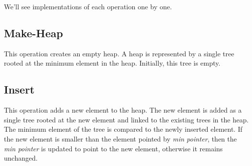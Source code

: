 \documentclass[12pt, a4paper]{article}
\begin{document}
	We'll see implementations of each operation one by one.

	
	\subsection{Make-Heap}
	This operation creates an empty heap. A heap is represented by a single tree rooted at the minimum element in the heap. Initially, this tree is empty.
	
	\subsection{Insert}
	This operation adds a new element to the heap. The new element is added as a single tree rooted at the new element and linked to the existing trees in the heap. The minimum element of the tree is compared to the newly inserted element. If the new element is smaller than the element pointed by \textit{min pointer}, then the \textit{min pointer} is updated to point to the new element, otherwise it remains unchanged.
	
\end{document}
